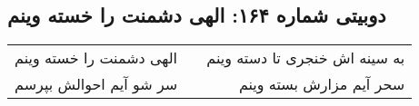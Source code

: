 \begin{center}
\section*{دوبیتی شماره ۱۶۴: الهی دشمنت را خسته وینم}
\label{sec:164}
\begin{longtable}{l p{0.5cm} r}
الهی دشمنت را خسته وینم
&&
به سینه اش خنجری تا دسته وینم
\\
سر شو آیم احوالش بپرسم
&&
سحر آیم مزارش بسته وینم
\\
\end{longtable}
\end{center}
